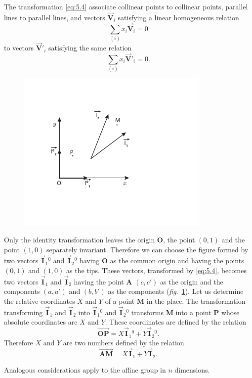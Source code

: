 \documentclass[leqno,11pt]{book}
\numberwithin{equation}{chapter}
\theoremstyle{shape1}
\theoremstyle{shapesmall}
\newcommand{\rvec}[1]{\vec{\mathbf{#1}}}
\newcommand{\ivec}{\rvec{I}}
\begin{document}
The transformation \eqref{eq:5.4} associate collinear points to collinear points, parallel lines to parallel lines, and vectors $\rvec{V}_{i}$ satisfying a linear homogeneous relation
\[
\sum_{(i)}x_{i}\rvec{V}_{i}=0
\]
to vectors $\rvec{V}'_{i}$ satisfying the same relation
\[
\sum_{(i)}x_{i}\rvec{V}'_{i}=0.
\]
\begin{figure}[h]
  \centering
\includegraphics[scale=2]{cartangrp-f4}  
  \caption{}
  \label{fig:4}
\end{figure}
Only the identity transformation leaves the origin $\mathbf{O}$, the point $(0,1)$ and the point $(1,0)$ separately invariant. Therefore we can choose the figure formed by two vectors $\ivec_{1}{}^{0}$ and $\ivec_{2}{}^{0}$ having $\mathbf{O}$ as the common origin and having the points $(0,1)$ and $(1,0)$ as the tips. These vectors, transformed by \eqref{eq:5.4}, becomes two vectors $\ivec_{1}$ and $\ivec_{2}$ having the point $\mathbf{A}$ $(c,c')$ as the origin and the components $(a,a')$ and $(b,b')$ as the components (\emph{fig}.~\ref{fig:4}). Let us determine the relative coordinates ${X}$ and ${Y}$ of a point $\mathbf{M}$ in the place. The transformation transforming $\ivec_{1}$ and $\ivec_{2}$ into $\ivec_{1}{}^{0}$ and $\ivec_{2}{}^{0}$ transforms $\mathbf{M}$ into a point $\mathbf{P}$ whose absolute coordinates are $X$ and $Y$. These coordinates are defined by the relation
\[
\overrightarrow{\mathbf{OP}}=X\ivec_{1}{}^{0}+Y\ivec_{2}{}^{0}.
\]
Therefore $X$ and $Y$ are two numbers defined by the relation
\[
\overrightarrow{\mathbf{AM}}=X\ivec_{1}+Y\ivec_{2}.
\]

Analogous considerations apply to the affine group in $n$ dimensions.
\end{document}
